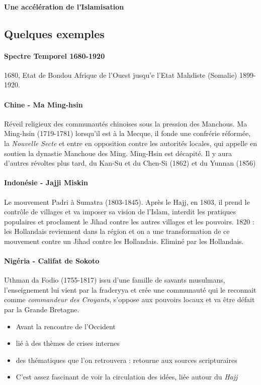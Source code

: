 \paragraph{Une accélération de l'Islamisation}


\subsection{Quelques exemples}

\paragraph{Spectre Temporel 1680-1920}{1680, Etat de Bondou} Afrique de l'Ouest jusqu'e l'Etat Mahdiste (Somalie) 1899-1920.

\paragraph{Chine - Ma Ming-hsin} Réveil religieux des communautés chinoises sous la pression des Manchous. Ma Ming-hsin (1719-1781) lorsqu'il est à la Mecque, il fonde une confrérie réformée, la \textit{Nouvelle Secte} et entre en opposition contre les autorités locales, qui appelle en soutien la dynastie Manchoue des Ming. Ming-Hsin est décapité. Il y aura d'autres révoltes plus tard, du Kan-Su et du Chen-Si (1862) et du Yunnan (1856)

\paragraph{Indonésie - Jajji Miskin} Le mouvement Padri à Sumatra (1803-1845). Après le Hajj, en 1803, il prend le contrôle de villages et va imposer sa vision de l'Islam, interdit les pratiques populaires et proclament le Jihad contre les autres villages et les pouvoirs. 1820 : les Hollandais reviennent dans la région et on a une transformation de ce mouvement contre un Jihad contre les Hollandais. Eliminé par les Hollandais.

\paragraph{Nigéria - Califat de Sokoto} Uthman da Fodio (1755-1817) issu d'une famille de savants musulmans, l'enseignement lui vient par la fraderyya et crée une communauté qui le reconnait comme \textit{commandeur des Croyants}, s'oppose aux pouvoirs locaux et va être défait par la Grande Bretagne.


\begin{Synthesis}
\begin{itemize}
Ce renouveau : 
    \item Avant la rencontre de l'Occident
    \item lié à des thèmes de crises internes
    \item des thématiques que l'on retrouvera : retourne aux sources scripturaires
    \item C'est assez fascinant de voir la circulation des idées, liée autour du \textit{Hajj}
\end{itemize}


\end{Synthesis}


